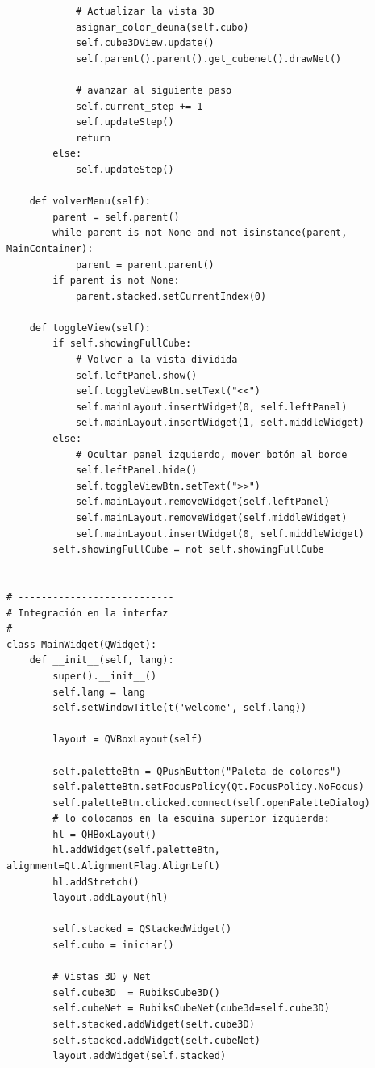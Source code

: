 \begin{lstlisting}
            # Actualizar la vista 3D
            asignar_color_deuna(self.cubo)
            self.cube3DView.update()
            self.parent().parent().get_cubenet().drawNet()
            
            # avanzar al siguiente paso
            self.current_step += 1
            self.updateStep()
            return
        else:
            self.updateStep()

    def volverMenu(self):
        parent = self.parent()
        while parent is not None and not isinstance(parent, MainContainer):
            parent = parent.parent()
        if parent is not None:
            parent.stacked.setCurrentIndex(0)  

    def toggleView(self):
        if self.showingFullCube:
            # Volver a la vista dividida
            self.leftPanel.show()
            self.toggleViewBtn.setText("<<")
            self.mainLayout.insertWidget(0, self.leftPanel)
            self.mainLayout.insertWidget(1, self.middleWidget)
        else:
            # Ocultar panel izquierdo, mover botón al borde
            self.leftPanel.hide()
            self.toggleViewBtn.setText(">>")
            self.mainLayout.removeWidget(self.leftPanel)
            self.mainLayout.removeWidget(self.middleWidget)
            self.mainLayout.insertWidget(0, self.middleWidget)
        self.showingFullCube = not self.showingFullCube


# ---------------------------
# Integración en la interfaz
# ---------------------------
class MainWidget(QWidget):
    def __init__(self, lang):
        super().__init__()
        self.lang = lang
        self.setWindowTitle(t('welcome', self.lang))  

        layout = QVBoxLayout(self)
        
        self.paletteBtn = QPushButton("Paleta de colores")
        self.paletteBtn.setFocusPolicy(Qt.FocusPolicy.NoFocus)
        self.paletteBtn.clicked.connect(self.openPaletteDialog)
        # lo colocamos en la esquina superior izquierda:
        hl = QHBoxLayout()
        hl.addWidget(self.paletteBtn, alignment=Qt.AlignmentFlag.AlignLeft)
        hl.addStretch()
        layout.addLayout(hl)
        
        self.stacked = QStackedWidget()
        self.cubo = iniciar()

        # Vistas 3D y Net
        self.cube3D  = RubiksCube3D()
        self.cubeNet = RubiksCubeNet(cube3d=self.cube3D)
        self.stacked.addWidget(self.cube3D)
        self.stacked.addWidget(self.cubeNet)
        layout.addWidget(self.stacked)


\end{lstlisting}
